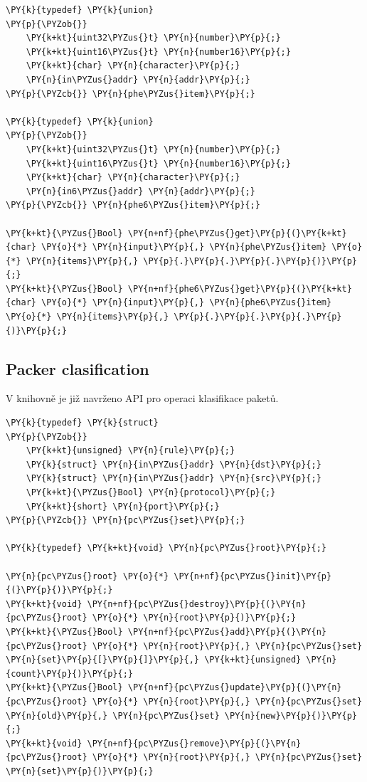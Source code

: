 \begin{Verbatim}[commandchars=\\\{\}]
\PY{k}{typedef} \PY{k}{union}
\PY{p}{\PYZob{}}
	\PY{k+kt}{uint32\PYZus{}t} \PY{n}{number}\PY{p}{;}
	\PY{k+kt}{uint16\PYZus{}t} \PY{n}{number16}\PY{p}{;}
	\PY{k+kt}{char} \PY{n}{character}\PY{p}{;}
	\PY{n}{in\PYZus{}addr} \PY{n}{addr}\PY{p}{;}
\PY{p}{\PYZcb{}} \PY{n}{phe\PYZus{}item}\PY{p}{;}

\PY{k}{typedef} \PY{k}{union}
\PY{p}{\PYZob{}}
	\PY{k+kt}{uint32\PYZus{}t} \PY{n}{number}\PY{p}{;}
	\PY{k+kt}{uint16\PYZus{}t} \PY{n}{number16}\PY{p}{;}
	\PY{k+kt}{char} \PY{n}{character}\PY{p}{;}
	\PY{n}{in6\PYZus{}addr} \PY{n}{addr}\PY{p}{;}
\PY{p}{\PYZcb{}} \PY{n}{phe6\PYZus{}item}\PY{p}{;}

\PY{k+kt}{\PYZus{}Bool} \PY{n+nf}{phe\PYZus{}get}\PY{p}{(}\PY{k+kt}{char} \PY{o}{*} \PY{n}{input}\PY{p}{,} \PY{n}{phe\PYZus{}item} \PY{o}{*} \PY{n}{items}\PY{p}{,} \PY{p}{.}\PY{p}{.}\PY{p}{.}\PY{p}{)}\PY{p}{;}
\PY{k+kt}{\PYZus{}Bool} \PY{n+nf}{phe6\PYZus{}get}\PY{p}{(}\PY{k+kt}{char} \PY{o}{*} \PY{n}{input}\PY{p}{,} \PY{n}{phe6\PYZus{}item} \PY{o}{*} \PY{n}{items}\PY{p}{,} \PY{p}{.}\PY{p}{.}\PY{p}{.}\PY{p}{)}\PY{p}{;}
\end{Verbatim}


\subsection{Packer clasification}
V knihovně je již navrženo API pro operaci klasifikace paketů.

\begin{Verbatim}[commandchars=\\\{\}]
\PY{k}{typedef} \PY{k}{struct}
\PY{p}{\PYZob{}}
	\PY{k+kt}{unsigned} \PY{n}{rule}\PY{p}{;}
	\PY{k}{struct} \PY{n}{in\PYZus{}addr} \PY{n}{dst}\PY{p}{;}
	\PY{k}{struct} \PY{n}{in\PYZus{}addr} \PY{n}{src}\PY{p}{;}
	\PY{k+kt}{\PYZus{}Bool} \PY{n}{protocol}\PY{p}{;}
	\PY{k+kt}{short} \PY{n}{port}\PY{p}{;}
\PY{p}{\PYZcb{}} \PY{n}{pc\PYZus{}set}\PY{p}{;}

\PY{k}{typedef} \PY{k+kt}{void} \PY{n}{pc\PYZus{}root}\PY{p}{;}

\PY{n}{pc\PYZus{}root} \PY{o}{*} \PY{n+nf}{pc\PYZus{}init}\PY{p}{(}\PY{p}{)}\PY{p}{;}
\PY{k+kt}{void} \PY{n+nf}{pc\PYZus{}destroy}\PY{p}{(}\PY{n}{pc\PYZus{}root} \PY{o}{*} \PY{n}{root}\PY{p}{)}\PY{p}{;}
\PY{k+kt}{\PYZus{}Bool} \PY{n+nf}{pc\PYZus{}add}\PY{p}{(}\PY{n}{pc\PYZus{}root} \PY{o}{*} \PY{n}{root}\PY{p}{,} \PY{n}{pc\PYZus{}set} \PY{n}{set}\PY{p}{[}\PY{p}{]}\PY{p}{,} \PY{k+kt}{unsigned} \PY{n}{count}\PY{p}{)}\PY{p}{;}
\PY{k+kt}{\PYZus{}Bool} \PY{n+nf}{pc\PYZus{}update}\PY{p}{(}\PY{n}{pc\PYZus{}root} \PY{o}{*} \PY{n}{root}\PY{p}{,} \PY{n}{pc\PYZus{}set} \PY{n}{old}\PY{p}{,} \PY{n}{pc\PYZus{}set} \PY{n}{new}\PY{p}{)}\PY{p}{;}
\PY{k+kt}{void} \PY{n+nf}{pc\PYZus{}remove}\PY{p}{(}\PY{n}{pc\PYZus{}root} \PY{o}{*} \PY{n}{root}\PY{p}{,} \PY{n}{pc\PYZus{}set} \PY{n}{set}\PY{p}{)}\PY{p}{;}
\end{Verbatim}




